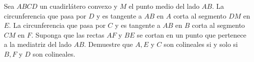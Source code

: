 Sea $ABCD$ un cuadirlátero convexo y $M$ el punto medio del lado $AB$. La circunferencia que pasa por $D$ y es tangente a $AB$ en $A$ corta al segmento $DM$ en $E$. La circunferencia que pasa por $C$ y es tangente a $AB$ en $B$ corta al segmento $CM$ en $F$. Suponga que las rectas $AF$ y $BE$ se cortan en un punto que pertenece a la mediatriz del lado $AB$. Demuestre que $A,E$ y $C$ son colineales si y solo si $B,F$ y $D$ son colineales.
